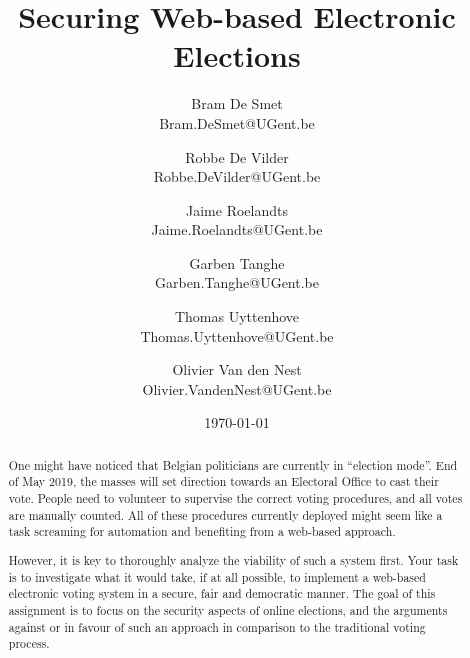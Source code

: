 \documentclass[a4paper,12pt]{article}
\title{Securing Web-based Electronic Elections}
\author{Bram De Smet \\ \small Bram.DeSmet@UGent.be \and Robbe De Vilder \\ \small Robbe.DeVilder@UGent.be \and Jaime Roelandts \\ \small Jaime.Roelandts@UGent.be \and Garben Tanghe \\ \small Garben.Tanghe@UGent.be \and Thomas Uyttenhove \\ \small Thomas.Uyttenhove@UGent.be \and Olivier Van den Nest \\ \small Olivier.VandenNest@UGent.be}
\date{\today}
\begin{document}
\maketitle

\newpage

\begin{abstract}
\noindent
One might have noticed that Belgian politicians are currently in ``election mode''. End of May 2019, the masses will set direction towards an Electoral Office to cast their vote. People need to volunteer to supervise the correct voting procedures, and all votes are manually counted. All of these procedures currently deployed might seem like a task screaming for automation and benefiting from a web-based approach.

\medskip
\noindent
However, it is key to thoroughly analyze the viability of such a system first. Your task is to investigate what it would take, if at all possible, to implement a web-based electronic voting system in a secure, fair and democratic manner. The goal of this assignment is to focus on the security aspects of online elections, and the arguments against or in favour of such an approach in comparison to the traditional voting process.
\end{abstract}

\tableofcontents

\newpage








\nocite{*}

\end{document}

